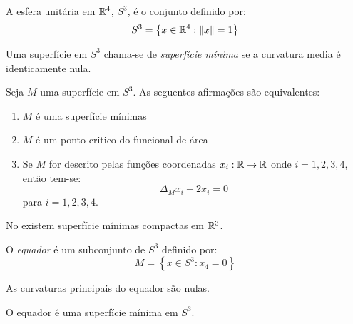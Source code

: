 \cite{Brendle2013}

\begin{definicao}
	A esfera unitária em $\mathbb{R}^4$, $S^3$, é o conjunto definido por:
	\begin{equation*}
		S^3 = \left\{ x \in \mathbb{R}^4: \| x \| = 1 \right\}
	\end{equation*}
\end{definicao}

\begin{definicao}
	Uma superfície em $S^3$ chama-se de \emph{superfície mínima} se a curvatura media é identicamente nula.
\end{definicao}

\begin{teorema}\label{propriedades_sup_min_S3}
	Seja $M$ uma superfície em $S^3$. As seguentes afirmações são equivalentes:
	\begin{enumerate}
		\item $M$ é uma superfície mínimas
		\item $M$ é um ponto critico do funcional de área
		\item Se $M$ for descrito pelas funções coordenadas $x_i: \mathbb{R} \rightarrow \mathbb{R}$ onde $i=1,2,3,4$, então tem-se:
		\begin{equation*}
			\Delta_{M} x_i + 2 x_i = 0
		\end{equation*}
		para $i=1,2,3,4$.
	\end{enumerate}
\end{teorema}

\begin{observacao}
	No existem superfície mínimas compactas em $\mathbb{R}^3$.
\end{observacao}

\begin{definicao}
	O \emph{equador} é um subconjunto de $S^3$ definido por:
	\begin{equation}
		M = \left\{ x \in S^3: x_4 = 0 \right\}
	\end{equation}
\end{definicao}

\begin{proposicao}
	As curvaturas principais do equador são nulas.
\end{proposicao}

\begin{corolario}
	O equador é uma superfície mínima em $S^3$.
\end{corolario}

